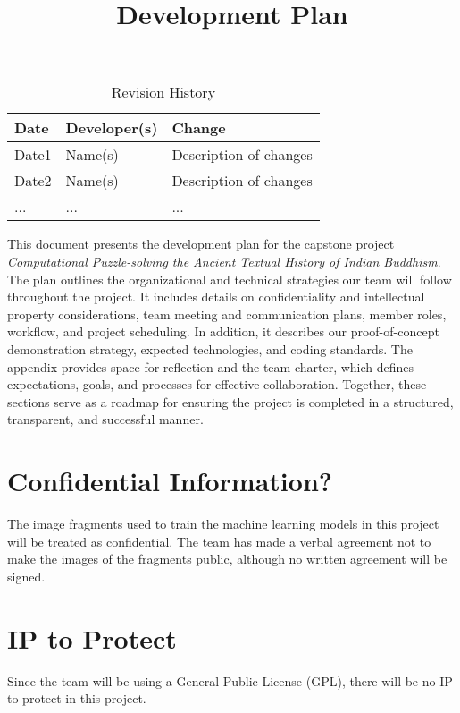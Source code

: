 \documentclass{article}
\title{Development Plan\\\progname}
\author{\authname}
\date{}
\begin{document}
\maketitle

\begin{table}[hp]
\caption{Revision History} \label{TblRevisionHistory}
\begin{tabularx}{\textwidth}{llX}
\toprule
\textbf{Date} & \textbf{Developer(s)} & \textbf{Change}\\
\midrule
Date1 & Name(s) & Description of changes\\
Date2 & Name(s) & Description of changes\\
... & ... & ...\\
\bottomrule
\end{tabularx}
\end{table}

\newpage{}

This document presents the development plan for the capstone project
\textit{Computational Puzzle-solving the Ancient Textual History of Indian Buddhism}.
The plan outlines the organizational and technical strategies our team will follow
throughout the project. It includes details on confidentiality and intellectual
property considerations, team meeting and communication plans, member roles, workflow,
and project scheduling. In addition, it describes our proof-of-concept demonstration
strategy, expected technologies, and coding standards. The appendix provides space
for reflection and the team charter, which defines expectations, goals, and processes
for effective collaboration. Together, these sections serve as a roadmap for ensuring
the project is completed in a structured, transparent, and successful manner.

\section{Confidential Information?}

The image fragments used to train the machine learning models in this project will be treated as confidential. The team has made a verbal agreement not to make the images of the fragments public, although no written agreement will be signed.

\section{IP to Protect}


Since the team will be using a General Public License (GPL), there will be no IP to protect in this project.
\end{document}
